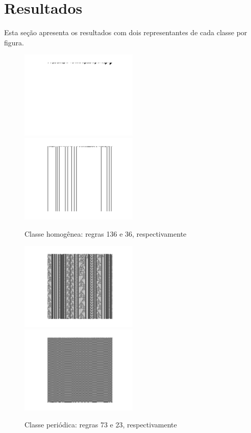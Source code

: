
\section{Resultados}

Esta seção apresenta os resultados com dois representantes de cada classe por
figura.

\begin{figure}[htb]
  \caption{Classe homogênea: regras 136 e 36, respectivamente}
  \includegraphics[width=0.5\textwidth]{figures/136.pdf}
  \includegraphics[width=0.5\textwidth]{figures/36.pdf}
  \label{fig:wolfram_homogeneous}
\end{figure}

\begin{figure}[htb]
  \caption{Classe periódica: regras 73 e 23, respectivamente}
  \includegraphics[width=0.5\textwidth]{figures/73.pdf}
  \includegraphics[width=0.5\textwidth]{figures/23.pdf}
  \label{fig:wolfram_periodic}
\end{figure}


